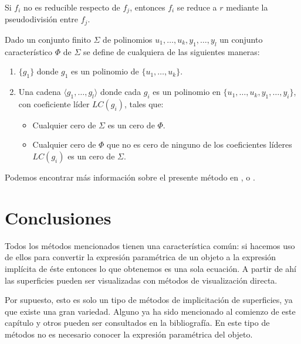 Si $f_i$ no es reducible respecto de $f_j$, entonces $f_i$ se reduce a $r$ mediante la pseudodivisión entre $f_j$.

\begin{definition}
	Dado un conjunto finito $\Sigma$ de polinomios $u_1, \dotso, u_k, y_1, \dotso, y_l$ un conjunto característico $\Phi$ de $\Sigma$ se define de cualquiera de las siguientes maneras:
	\begin{enumerate}
		\item $\{ g_1 \}$ donde $g_1$ es un polinomio de $\{ u_1, \dotso, u_k \}$.
		\item Una cadena $\langle g_1, \dotso, g_l \rangle$ donde cada $g_i$ es un polinomio en $\{ u_1, \dotso, u_k, y_1, \dotso, y_i \}$, con coeficiente líder $LC(g_i)$, tales que:
		\begin{itemize}
			\item Cualquier cero de $\Sigma$ es un cero de $\Phi$.
			\item Cualquier cero de $\Phi$ que no es cero de ninguno de los coeficientes líderes $LC(g_i)$ es un cero de $\Sigma$.
		\end{itemize}
	\end{enumerate}
\end{definition}
Podemos encontrar más información sobre el presente método en \cite{Berchtold00}, \cite{Gallo91_2} o \cite{Gallo91_1}.

\section{Conclusiones}

Todos los métodos mencionados tienen una característica común: si hacemos uso de ellos para convertir la expresión paramétrica de un objeto a la expresión implícita de éste entonces lo que obtenemos es una sola ecuación. A partir de ahí las superficies pueden ser visualizadas con métodos de visualización directa.

Por supuesto, esto es solo un tipo de métodos de implicitación de superficies, ya que existe una  gran variedad. Alguno ya ha sido mencionado al comienzo de este capítulo y otros pueden ser consultados en la bibliografía. En este tipo de métodos no es necesario conocer la expresión paramétrica del objeto.